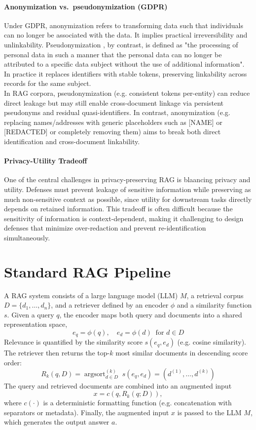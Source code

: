\paragraph{Anonymization vs.\ pseudonymization (GDPR)}
Under GDPR, anonymization refers to transforming data such that individuals can no longer be associated with the data. It implies practical irreversibility and unlinkability. Pseudonymization , by contrast, is defined as "the processing of personal data in such a manner that the personal data can no longer be attributed to a specific data subject without the use of additional information". \cite{anonDefinition} In practice it replaces identifiers with stable tokens, preserving linkability across records for the same subject.\\
In \ac{RAG} corpora, pseudonymization (e.g. consistent tokens per-entity) can reduce direct leakage but may still enable cross-document linkage via persistent pseudonyms and residual quasi-identifiers. In contrast, anonymization (e.g. replacing names/addresses with generic placeholders such as [NAME] or [REDACTED] or completely removing them) aims to break both direct identification and cross-document linkability.

\paragraph{Privacy-Utility Tradeoff}
One of the central challenges in privacy-preserving \ac{RAG} is blaancing privacy and utility. Defenses must prevent leakage of sensitive information while preserving as much non-sensitive context as possible, since utility for downstream tasks directly depends on retained information. This tradeoff is often difficult because the sensitivity of information is context-dependent, making it challenging to design defenses that minimize over-redaction and prevent re-identification simultaneously.


\section{Standard RAG Pipeline}
A \ac{RAG} system consists of a large language model (LLM) $M$, a retrieval corpus $D=\{d_1,\dots,d_n\}$, and a retriever defined by an encoder $\phi$ and a similarity function $s$. 
Given a query $q$, the encoder maps both query and documents into a shared representation space,
\[
e_q = \phi(q), \quad e_d = \phi(d) \;\; \text{for } d \in D
\]
Relevance is quantified by the similarity score $s(e_q,e_d)$ (e.g. cosine similarity).  
The retriever then returns the top-$k$ most similar  documents in descending score order:
\[
R_k(q,D) = \operatorname{argsort}_{d \in D}^{(k)} \; s(e_q,e_d) = (d^{(1)}, \dots, d^{(k)})
\]
The query and retrieved documents are combined into an augmented input
\[
x = c(q, R_k(q;D)),
\]
where $c(\cdot)$ is a deterministic formatting function (e.g. concatenation with separators or metadata).  
Finally, the augmented input $x$ is passed to the LLM $M$, which generates the output answer $a$.


